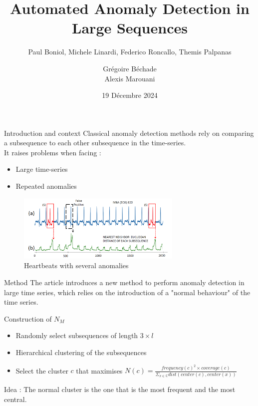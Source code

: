 \documentclass[french]{beamer}
\title{Automated Anomaly Detection in Large Sequences}
\subtitle{ Paul Boniol, Michele Linardi, Federico Roncallo, Themis Palpanas}
\author{ Grégoire Béchade \\ Alexis Marouani}
\date{19 Décembre 2024}
\begin{document}
\begin{frame}
	\titlepage
\end{frame}


\begin{frame}{Introduction and context}
    Classical anomaly detection methods rely on comparing a subsequence to each other subsequence in the time-series. \\
    It raises problems when facing : 
    \begin{itemize}
        \item Large time-series
        \item Repeated anomalies\\[0.5cm]
    \end{itemize}

    \begin{figure}
        \centering
        \includegraphics[width=0.7\textwidth]{heartbeats.png}
        \caption{Heartbeats with several anomalies}
    \end{figure}
    
\end{frame}

\begin{frame}{Method}
    The article introduces a new method to perform anomaly detection in large time series, which relies on the introduction of a "normal behaviour" of the time series.\\[1cm]
    \begin{exampleblock}{Construction of $N_M$}
        \begin{itemize}
            \item Randomly select subsequences of length $3 \times l$
            \item Hierarchical clustering of the subsequences
            \item Select the cluster $c$ that maximises $N(c) = \frac{frequency (c)^2 \times coverage (c) }{ \Sigma_{x \in \mathbb{C} } dist(center(c), center(x))}$
        \end{itemize}
    

    \end{exampleblock}
\tiny{Idea : The normal cluster is the one that is the most frequent and the most central.}
    
\end{frame}
\end{document}

